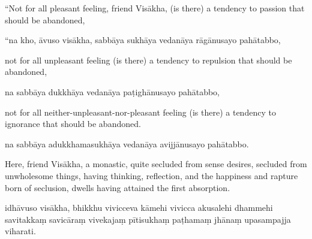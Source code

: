 \begin{samepage}
\begin{leftcolumn*}
“Not for all pleasant feeling, friend Visākha, (is there) a tendency to passion that should be abandoned,
\end{leftcolumn*}

\begin{rightcolumn}
“na kho, āvuso visākha, sabbāya sukhāya vedanāya rāgānusayo pahātabbo,
\end{rightcolumn}
\end{samepage}

\begin{samepage}
\begin{leftcolumn*}
not for all unpleasant feeling (is there) a tendency to repulsion that should be abandoned,
\end{leftcolumn*}

\begin{rightcolumn}
na sabbāya dukkhāya vedanāya paṭighānusayo pahātabbo,
\end{rightcolumn}
\end{samepage}

\begin{samepage}
\begin{leftcolumn*}
not for all neither-unpleasant-nor-pleasant feeling (is there) a tendency to ignorance that should be abandoned.
\end{leftcolumn*}

\begin{rightcolumn}
na sabbāya adukkhamasukhāya vedanāya avijjānusayo pahātabbo.
\end{rightcolumn}
\end{samepage}

\begin{samepage}
\begin{leftcolumn*}
Here, friend Visākha, a monastic, quite secluded from sense desires, secluded from unwholesome things, having thinking, reflection, and the happiness and rapture born of seclusion, dwells having attained the first absorption.
\end{leftcolumn*}

\begin{rightcolumn}
idhāvuso visākha, bhikkhu vivicceva kāmehi vivicca akusalehi dhammehi savitakkaṃ savicāraṃ vivekajaṃ pītisukhaṃ paṭhamaṃ jhānaṃ upasampajja viharati.
\end{rightcolumn}
\end{samepage}

